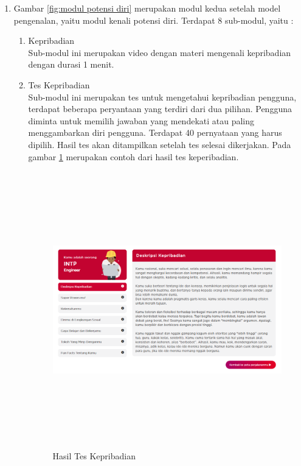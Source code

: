 \begin{enumerate}
    \item Gambar \ref{fig:modul potensi diri} merupakan modul kedua setelah model pengenalan, yaitu modul kenali potensi diri. Terdapat 8 sub-modul, yaitu :
    \begin{enumerate}
        \item Kepribadian \\
            Sub-modul ini merupakan video dengan materi mengenali kepribadian dengan durasi 1 menit. 
            
        \item Tes Kepribadian \\
            Sub-modul ini merupakan tes untuk mengetahui kepribadian pengguna, terdapat beberapa peryantaan yang terdiri dari dua pilihan. Pengguna diminta untuk memilih jawaban yang mendekati atau paling menggambarkan diri pengguna. Terdapat 40 pernyataan yang harus dipilih. Hasil tes akan ditampilkan setelah tes selesai dikerjakan. Pada gambar \ref{fig:hasil tes kepribadian} merupakan contoh dari hasil tes keperibadian.
            
            \begin{figure}[H]
                \centering
                \includegraphics[width = 10cm, height = 12cm]{doc/DokumenSkripsi/Gambar/gambar35.PNG}
                \caption{Hasil Tes Kepribadian}
                \label{fig:hasil tes kepribadian}
            \end{figure}
            

\end{enumerate}
\end{enumerate}
